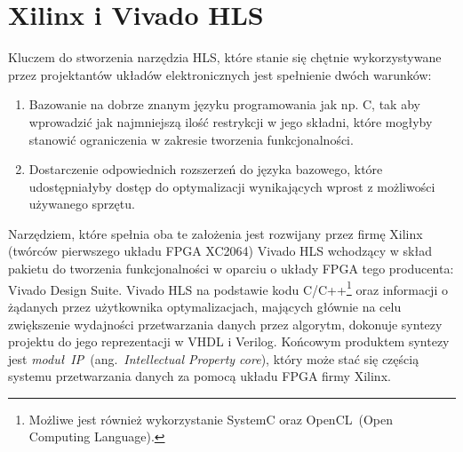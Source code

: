 \section{Xilinx i Vivado HLS}
Kluczem do stworzenia narzędzia HLS, które stanie się chętnie wykorzystywane przez projektantów układów elektronicznych jest spełnienie dwóch warunków:
\begin{enumerate}
\item Bazowanie na dobrze znanym języku programowania jak np. C, tak aby wprowadzić jak najmniejszą ilość restrykcji w jego składni, które mogłyby stanowić ograniczenia w zakresie tworzenia funkcjonalności.
\item Dostarczenie odpowiednich rozszerzeń do języka bazowego, które udostępniałyby dostęp do optymalizacji wynikających wprost z możliwości używanego sprzętu.
\end{enumerate}
Narzędziem, które spełnia oba te założenia jest rozwijany przez firmę Xilinx (twórców pierwszego układu FPGA XC2064) Vivado HLS wchodzący w skład pakietu do tworzenia funkcjonalności w oparciu o układy FPGA tego producenta: Vivado Design Suite. Vivado HLS na podstawie kodu C/C++\footnote{Możliwe jest również wykorzystanie SystemC oraz OpenCL~(Open Computing Language).} oraz informacji o żądanych przez użytkownika optymalizacjach, mających głównie na celu zwiększenie wydajności przetwarzania danych przez algorytm, dokonuje syntezy projektu do jego reprezentacji w VHDL i Verilog. Końcowym produktem syntezy jest \textit{moduł~IP}~(ang.~\textit{Intellectual Property core}), który może stać się częścią systemu przetwarzania danych za pomocą układu FPGA firmy Xilinx.

